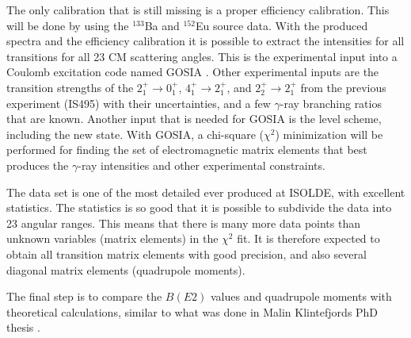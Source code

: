 \documentclass[twoside,english]{uiofysmaster/uiofysmaster}
\newcommand{\ga}{$\gamma$}
\begin{document}
The only calibration that is still missing is a proper efficiency calibration. 
This will be done by using the $^{133}$Ba and $^{152}$Eu source data.
With the produced spectra and the efficiency calibration it is possible to extract the intensities for all transitions for all 23 CM scattering angles. 
This is the experimental input into a Coulomb excitation code named GOSIA \cite{GOSIA}.
Other experimental inputs are the transition strengths of the $2_1^+ \rightarrow 0_1^+$, $4_1^+ \rightarrow 2_1^+$, and $2_2^+ \rightarrow 2_1^+$ from the previous experiment (IS495) with their uncertainties, and a few \ga-ray branching ratios that are known. 
Another input that is needed for GOSIA is the level scheme, including the new state. 
With GOSIA, a chi-square ($\chi^2$) minimization will be performed for finding the set of electromagnetic matrix elements that best produces the \ga-ray intensities and other experimental constraints.

The data set is one of the most detailed ever produced at ISOLDE, with excellent statistics. 
The statistics is so good that it is possible to subdivide the data into 23 angular ranges. 
This means that there is many more data points than unknown variables (matrix elements) in the $\chi^2$ fit.
It is therefore expected to obtain all transition matrix elements with good precision, and also several diagonal matrix elements (quadrupole moments).

The final step is to compare the $B(E2)$ values and quadrupole moments with theoretical calculations, similar to what was done in Malin Klintefjords PhD thesis \cite{Klintefjord}.




%	


\end{document}
